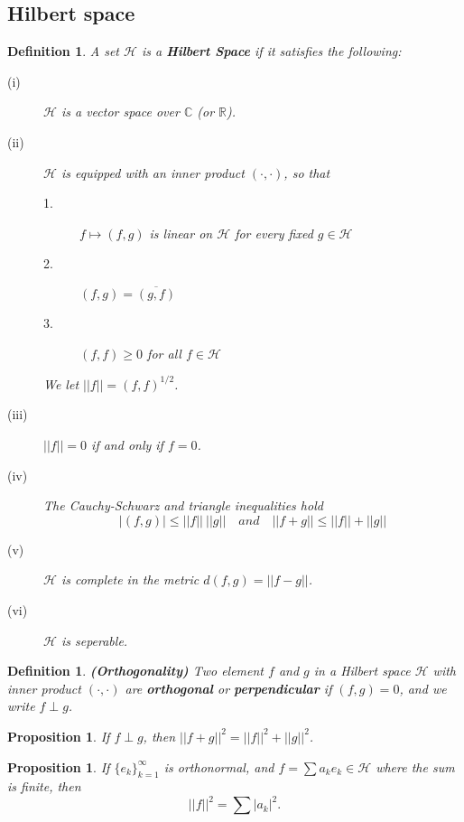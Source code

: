 \documentclass[11pt]{article}
\newtheorem{definition}[theorem]{Definition}
\newtheorem{proposition}[theorem]{Proposition}
\begin{document}
\subsection{Hilbert space}
\begin{definition}
    A set $\mathcal{H}$ is a \textbf{Hilbert Space} if it satisfies the following:
    \begin{description}
        \item[(i)] $\mathcal{H}$ is a vector space over $\mathbb{C}$ (or $\mathbb{R}$).
        \item[(ii)] $\mathcal{H}$ is equipped with an inner product $(\cdot,\cdot)$, so that
        \begin{description}
            \item[1.] $f\mapsto (f,g)$ is linear on $\mathcal{H} $ for every fixed $g\in \mathcal{H} $
            \item[2.] $(f,g)=\overline{(g,f)}$
            \item[3.] $(f,f)\geq 0$ for all $f\in \mathcal{H} $ 
        \end{description}
        We let $||f||=(f,f)^{1/2}$.
        \item[(iii)] $||f||=0$ if and only if $f=0$.
        \item[(iv)] The Cauchy-Schwarz and triangle inequalities hold \[|(f,g)|\leq ||f||\ ||g||\quad and\quad ||f+g||\leq||f||+||g||\] 
        \item[(v)] $\mathcal{H} $ is complete in the metric $d(f,g)=||f-g||$.
        \item[(vi)] $\mathcal{H} $ is seperable.
    \end{description}
\end{definition}

\begin{definition}
    \textbf{(Orthogonality)}
    Two element $f$ and $g$ in a Hilbert space $\mathcal{H}$ with inner product $(\cdot,\cdot)$ are \textbf{orthogonal} or \textbf{perpendicular} if $(f,g)=0$, and we write $f\perp g$.
\end{definition}

\begin{proposition}
    If $f\perp g$, then $||f+g||^2=||f||^2+||g||^2$.
\end{proposition}

\begin{proposition}
    If $\{e_k\}_{k=1}^\infty$ is orthonormal, and $f=\sum a_ke_k\in \mathcal{H}$ where the sum is finite, then
    \[||f||^2=\sum|a_k|^2.\]
\end{proposition}
\end{document}
